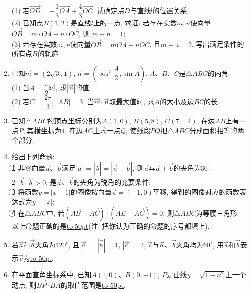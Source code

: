 \documentclass[10pt,a4paper]{article}
\newcommand{\blank}[1]{\underline{\hbox to #1pt{}}}
\begin{document}
\begin{enumerate}[1.]
(1) 若$\overrightarrow{OD}=-\dfrac 13\overrightarrow{OA}+\dfrac 43\overrightarrow{OC}$, 试确定点$D$与直线$l$的位置关系;\\
(2) 已知点$B(1,2)$是直线$l$上的一点, 求证: 若存在实数$m,n$使向量$\overrightarrow{OB}=m\cdot \overrightarrow{OA}+n\cdot \overrightarrow{OC}$, 则 $m+n=1$;\\
(3) 若存在实数$m,n$使向量$\overrightarrow{OB}=m\overrightarrow{OA}+n\overrightarrow{OC}$, 且$m+n=2$, 写出满足条件的所有点$B$的轨迹.
\item 已知$\overrightarrow m=(2\sqrt 3,1)$, $\overrightarrow n=(\cos^2\dfrac A2,\sin A)$, $A$、$B$、$C$是$\triangle ABC$的内角.\\
(1) 当$A=\dfrac{\pi}2$时, 求$|\overrightarrow n|$的值;\\
(2) 若$C=\dfrac{2\pi}3$, $|AB|=3$, 当$\overrightarrow m\cdot\overrightarrow n$取最大值时, 求$A$的大小及边$BC$的长.
\item 已知$\triangle ABC$的顶点坐标分别为$A(1,0)$, $B(5,8)$, $C(7,-4)$, 在边$AB$上有一点$P$, 其横坐标为$4$, 在边$AC$上求一点$Q$, 使线段$PQ$把$\triangle ABC$分成面积相等的两个部分.
\item 给出下列命题:\\
\textcircled{1} 非零向量$\overrightarrow a$、$\overrightarrow b$满足$|\overrightarrow a|=|\overrightarrow b|=|\overrightarrow a-\overrightarrow b|$, 则$\overrightarrow a$与$\overrightarrow a+\overrightarrow b$的夹角为$30^\circ$;\\
\textcircled{2} $\overrightarrow b\cdot \overrightarrow b>0$, 是$\overrightarrow a$、$\overrightarrow b$的夹角为锐角的充要条件;\\
\textcircled{3}  将函数$y=|x-1|$的图像按向量$\overrightarrow a=(-1,0)$平移, 得到的图像对应的函数表达式为$y=|x|$;\\
\textcircled{4} 在$\triangle ABC$中, 若$(\overrightarrow{AB}+\overrightarrow{AC})\cdot (\overrightarrow{AB}-\overrightarrow{AC})=0$, 则$\triangle ABC$为等腰三角形.\\
以上命题正确的是\blank{50}(注: 把你认为正确的命题的序号都填上).
\item 若$\overrightarrow a$和$\overrightarrow b$夹角为$120^\circ$, 且$|\overrightarrow a|=|\overrightarrow b|=1$, $| \overrightarrow c|=2$, $\overrightarrow c$与$\overrightarrow a$、$\overrightarrow b$夹角均为$60^\circ$, 用$\overrightarrow a$和$\overrightarrow b$表示$\overrightarrow c$为\blank{50}.
\item 在平面直角坐标系中, 已知$A(1,0)$、$B(0,-1)$, $P$是曲线$y=\sqrt{1-x^2}$上一个动点, 则$\overrightarrow{BP}\cdot \overrightarrow{BA}$的取值范围是\blank{50}.

\end{enumerate}
\end{document}
